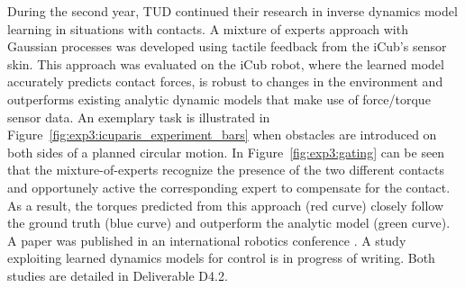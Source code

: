During the second year, TUD continued their research in inverse dynamics model
learning in situations with contacts. A mixture of experts approach with
Gaussian processes was developed using tactile feedback from the iCub's sensor
skin. This approach was evaluated on the iCub robot, where the learned model
accurately predicts contact forces, is robust to changes in the environment and
outperforms existing analytic dynamic models that make use of force/torque
sensor data. 
An exemplary task is illustrated in Figure~\ref{fig:exp3:icuparis_experiment_bars} 
when obstacles are introduced on both sides of a planned circular motion.
In Figure~\ref{fig:exp3:gating} can be seen that the mixture-of-experts recognize the presence of the two different contacts and opportunely active the corresponding expert to compensate for the contact.
As a result, the torques predicted from this approach (red curve) closely follow the ground truth (blue curve) and outperform the analytic model (green curve).
A paper was published in an international robotics conference
\cite{Calandra_ICRA15}. A study exploiting learned dynamics models
for control is in progress of writing. Both studies are detailed in Deliverable
D4.2.\\

